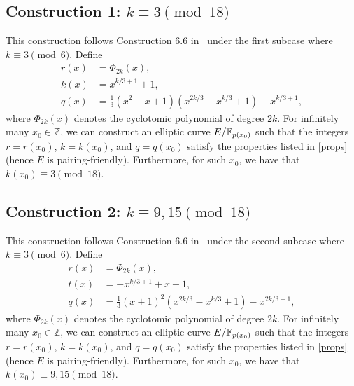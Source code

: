 
\subsection{Construction 1: $k \equiv 3 \pmod{18}$}
This construction follows Construction 6.6 in~\cite{2010/freeman}
under the first subcase where $k \equiv 3 \pmod{6}$.
Define
\begin{align*}
r(x) &= \Phi_{2k}(x),	\\
k(x) &= x^{k/3+1} + 1,	\\
q(x) &= \frac{1}{3} (x^2 - x + 1) (x^{2k/3} - x^{k/3} + 1) + x^{k/3+1},
\end{align*}
where $\Phi_{2k}(x)$ denotes the cyclotomic polynomial of degree $2k$. For infinitely many $x_{0}\in \mathbb{Z}$, we can construct an elliptic curve $E/\mathbb{F}_{p(x_{0})}$ such that the integers $r=r(x_{0})$, $k=k(x_{0})$, and $q=q(x_{0})$ satisfy the properties listed in \ref{props} (hence $E$ is pairing-friendly). Furthermore, for such $x_{0}$, we have that $k(x_{0}) \equiv 3 \pmod{18}$.


\subsection{Construction 2: $k \equiv 9,15 \pmod{18}$}
This construction follows Construction 6.6 in~\cite{2010/freeman}
under the second subcase where $k \equiv 3 \pmod{6}$.
Define
\begin{align*}
r(x) &= \Phi_{2k}(x),	\\
t(x) &= -x^{k/3+1} + x + 1,	\\
q(x) &= \frac{1}{3} (x+1)^2 (x^{2k/3} - x^{k/3} + 1) - x^{2k/3+1},
\end{align*}
where $\Phi_{2k}(x)$ denotes the cyclotomic polynomial of degree $2k$. For infinitely many $x_{0}\in \mathbb{Z}$, we can construct an elliptic curve $E/\mathbb{F}_{p(x_{0})}$ such that the integers $r=r(x_{0})$, $k=k(x_{0})$, and $q=q(x_{0})$ satisfy the properties listed in \ref{props} (hence $E$ is pairing-friendly). Furthermore, for such $x_{0}$, we have that
$k(x_{0}) \equiv 9,15 \pmod{18}$.


